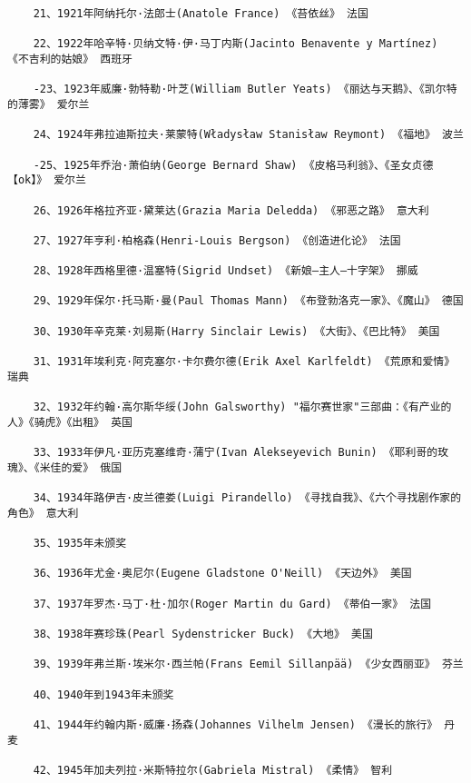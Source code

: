 \documentclass[UTF8]{../RepresentationUniverse}
\begin{document}
\begin{lstlisting}
    21、1921年阿纳托尔·法郎士(Anatole France) 《苔依丝》 法国
    
    22、1922年哈辛特·贝纳文特·伊·马丁内斯(Jacinto Benavente y Martínez) 《不吉利的姑娘》 西班牙
    
    -23、1923年威廉·勃特勒·叶芝(William Butler Yeats) 《丽达与天鹅》、《凯尔特的薄雾》 爱尔兰
    
    24、1924年弗拉迪斯拉夫·莱蒙特(Władysław Stanisław Reymont) 《福地》 波兰
    
    -25、1925年乔治·萧伯纳(George Bernard Shaw) 《皮格马利翁》、《圣女贞德【ok】》 爱尔兰
    
    26、1926年格拉齐亚·黛莱达(Grazia Maria Deledda) 《邪恶之路》 意大利
    
    27、1927年亨利·柏格森(Henri-Louis Bergson) 《创造进化论》 法国
    
    28、1928年西格里德·温塞特(Sigrid Undset) 《新娘—主人—十字架》 挪威
    
    29、1929年保尔·托马斯·曼(Paul Thomas Mann) 《布登勃洛克一家》、《魔山》 德国
    
    30、1930年辛克莱·刘易斯(Harry Sinclair Lewis) 《大街》、《巴比特》 美国
    
    31、1931年埃利克·阿克塞尔·卡尔费尔德(Erik Axel Karlfeldt) 《荒原和爱情》 瑞典
    
    32、1932年约翰·高尔斯华绥(John Galsworthy) "福尔赛世家"三部曲：《有产业的人》《骑虎》《出租》 英国
    
    33、1933年伊凡·亚历克塞维奇·蒲宁(Ivan Alekseyevich Bunin) 《耶利哥的玫瑰》、《米佳的爱》 俄国
    
    34、1934年路伊吉·皮兰德娄(Luigi Pirandello) 《寻找自我》、《六个寻找剧作家的角色》 意大利
    
    35、1935年未颁奖
    
    36、1936年尤金·奥尼尔(Eugene Gladstone O'Neill) 《天边外》 美国
    
    37、1937年罗杰·马丁·杜·加尔(Roger Martin du Gard) 《蒂伯一家》 法国
    
    38、1938年赛珍珠(Pearl Sydenstricker Buck) 《大地》 美国
    
    39、1939年弗兰斯·埃米尔·西兰帕(Frans Eemil Sillanpää) 《少女西丽亚》 芬兰
    
    40、1940年到1943年未颁奖
    
    41、1944年约翰内斯·威廉·扬森(Johannes Vilhelm Jensen) 《漫长的旅行》 丹麦
    
    42、1945年加夫列拉·米斯特拉尔(Gabriela Mistral) 《柔情》 智利
    

\end{lstlisting}
\end{document}
